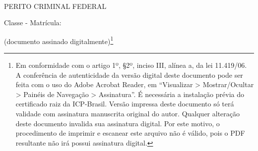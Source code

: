 \bigskip
\begin{center}
	~\bigskip

	\textbf{\MakeUppercase{\pfauthor}}
	
	PERITO CRIMINAL FEDERAL
	
	Classe \pfauthorclass\space - Matrícula: \pfauthormatr

	(documento assinado digitalmente)\footnote{%
		Em conformidade com o artigo 1º, \S 2º, inciso III, alínea a, da lei 11.419/06.
		A conferência de autenticidade da versão digital deste documento pode ser feita com o uso do Adobe Acrobat Reader, em ``Visualizar > Mostrar/Ocultar > Painéis de Navegação > Assinatura''. É necessária a instalação prévia do certificado raiz da ICP-Brasil.
		Versão impressa deste documento só terá validade com assinatura manuscrita original do autor.
		Qualquer alteração deste documento invalida sua assinatura digital. Por este motivo, o procedimento de imprimir e escanear este arquivo não é válido, pois o PDF resultante não irá possui assinatura digital.
	}
\end{center}

